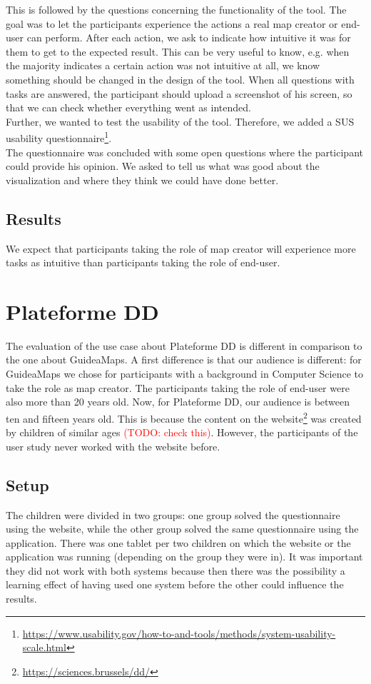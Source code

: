 This is followed by the questions concerning the functionality of the tool. The goal was to let the participants experience the actions a real map creator or end-user can perform. After each action, we ask to indicate how intuitive it was for them to get to the expected result. This can be very useful to know, e.g. when the majority indicates a certain action was not intuitive at all, we know something should be changed in the design of the tool. When all questions with tasks are answered, the participant should upload a screenshot of his screen, so that we can check whether everything went as intended.\\

Further, we wanted to test the usability of the tool. Therefore, we added a SUS usability questionnaire\footnote{\url{https://www.usability.gov/how-to-and-tools/methods/system-usability-scale.html}}.\\

The questionnaire was concluded with some open questions where the participant could provide his opinion. We asked to tell us what was good about the visualization and where they think we could have done better.

\subsection{Results}
We expect that participants taking the role of map creator will experience more tasks as intuitive than participants taking the role of end-user.




\section{Plateforme DD}
The evaluation of the use case about Plateforme DD is different in comparison to the one about GuideaMaps. A first difference is that our audience is different: for GuideaMaps we chose for participants with a background in Computer Science to take the role as map creator. The participants taking the role of end-user were also more than 20 years old. Now, for Plateforme DD, our audience is between ten and fifteen years old. This is because the content on the website\footnote{\url{https://sciences.brussels/dd/}} was created by children of similar ages \textcolor{red}{(TODO: check this)}. However, the participants of the user study never worked with the website before.

\subsection{Setup}
The children were divided in two groups: one group solved the questionnaire using the website, while the other group solved the same questionnaire using the application. There was one tablet per two children on which the website or the application was running (depending on the group they were in). It was important they did not work with both systems because then there was the possibility a learning effect of having used one system before the other could influence the results. 

